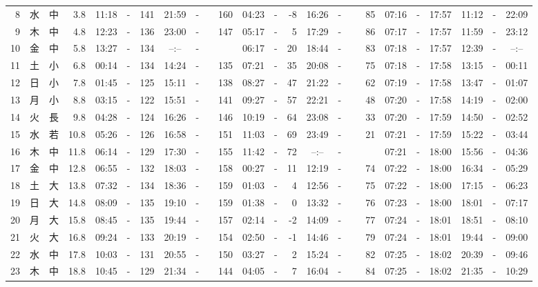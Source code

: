 \documentclass[12pt,a4j]{jsarticle}
\begin{document}
\begin{table}[htbp]
\begin{center}
{\begin{tabular}{|rc|cr|ccrccr|ccrccr|ccc|ccc|}
 8 & 水 & 中 &  3.8 &  11:18 &-& 141 &  21:59 &-& 160 &  04:23 &-&  -8 &  16:26 &-&  85 & 07:16 & -& 17:57 & 11:12 & -& 22:09 \\
 9 & 木 & 中 &  4.8 &  12:23 &-& 136 &  23:00 &-& 147 &  05:17 &-&   5 &  17:29 &-&  86 & 07:17 & -& 17:57 & 11:59 & -& 23:12 \\
10 & 金 & 中 &  5.8 &  13:27 &-& 134 &  --:-- &-&~~~~~ &  06:17 &-&  20 &  18:44 &-&  83 & 07:18 & -& 17:57 & 12:39 & -& --:-- \\
11 & 土 & 小 &  6.8 &  00:14 &-& 134 &  14:24 &-& 135 &  07:21 &-&  35 &  20:08 &-&  75 & 07:18 & -& 17:58 & 13:15 & -& 00:11 \\
12 & 日 & 小 &  7.8 &  01:45 &-& 125 &  15:11 &-& 138 &  08:27 &-&  47 &  21:22 &-&  62 & 07:19 & -& 17:58 & 13:47 & -& 01:07 \\
13 & 月 & 小 &  8.8 &  03:15 &-& 122 &  15:51 &-& 141 &  09:27 &-&  57 &  22:21 &-&  48 & 07:20 & -& 17:58 & 14:19 & -& 02:00 \\
14 & 火 & 長 &  9.8 &  04:28 &-& 124 &  16:26 &-& 146 &  10:19 &-&  64 &  23:08 &-&  33 & 07:20 & -& 17:59 & 14:50 & -& 02:52 \\
15 & 水 & 若 & 10.8 &  05:26 &-& 126 &  16:58 &-& 151 &  11:03 &-&  69 &  23:49 &-&  21 & 07:21 & -& 17:59 & 15:22 & -& 03:44 \\
16 & 木 & 中 & 11.8 &  06:14 &-& 129 &  17:30 &-& 155 &  11:42 &-&  72 &  --:-- &-&~~~~~ & 07:21 & -& 18:00 & 15:56 & -& 04:36 \\
17 & 金 & 中 & 12.8 &  06:55 &-& 132 &  18:03 &-& 158 &  00:27 &-&  11 &  12:19 &-&  74 & 07:22 & -& 18:00 & 16:34 & -& 05:29 \\
18 & 土 & 大 & 13.8 &  07:32 &-& 134 &  18:36 &-& 159 &  01:03 &-&   4 &  12:56 &-&  75 & 07:22 & -& 18:00 & 17:15 & -& 06:23 \\
19 & 日 & 大 & 14.8 &  08:09 &-& 135 &  19:10 &-& 159 &  01:38 &-&   0 &  13:32 &-&  76 & 07:23 & -& 18:00 & 18:01 & -& 07:17 \\
20 & 月 & 大 & 15.8 &  08:45 &-& 135 &  19:44 &-& 157 &  02:14 &-&  -2 &  14:09 &-&  77 & 07:24 & -& 18:01 & 18:51 & -& 08:10 \\
21 & 火 & 大 & 16.8 &  09:24 &-& 133 &  20:19 &-& 154 &  02:50 &-&  -1 &  14:46 &-&  79 & 07:24 & -& 18:01 & 19:44 & -& 09:00 \\
22 & 水 & 中 & 17.8 &  10:03 &-& 131 &  20:55 &-& 150 &  03:27 &-&   2 &  15:24 &-&  82 & 07:25 & -& 18:02 & 20:39 & -& 09:46 \\
23 & 木 & 中 & 18.8 &  10:45 &-& 129 &  21:34 &-& 144 &  04:05 &-&   7 &  16:04 &-&  84 & 07:25 & -& 18:02 & 21:35 & -& 10:29 \\

\end{tabular}}
\end{center}
\end{table}
\end{document}
